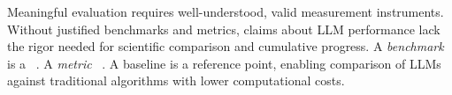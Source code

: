 
Meaningful evaluation requires well-understood, valid measurement instruments.
Without justified benchmarks and metrics, claims about LLM performance lack the rigor needed for scientific comparison and cumulative progress.
A \textit{benchmark} is a ~\cite{DBLP:conf/wosp/KistowskiAHLHC15}. A \textit{metric} ~\cite{DBLP:books/sp/24/RalphKAA24}. A baseline is a reference point, enabling comparison of LLMs against traditional algorithms with lower computational costs.


